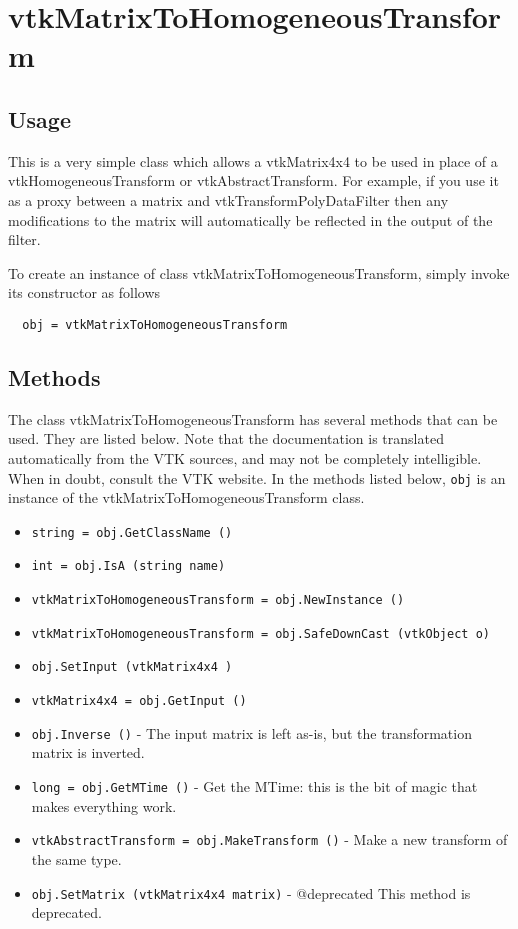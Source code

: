\section{vtkMatrixToHomogeneousTransform}

\subsection{Usage}

 This is a very simple class which allows a vtkMatrix4x4 to be used in
 place of a vtkHomogeneousTransform or vtkAbstractTransform.  For example,
 if you use it as a proxy between a matrix and vtkTransformPolyDataFilter
 then any modifications to the matrix will automatically be reflected in
 the output of the filter.

To create an instance of class vtkMatrixToHomogeneousTransform, simply
invoke its constructor as follows
\begin{verbatim}
  obj = vtkMatrixToHomogeneousTransform
\end{verbatim}
\subsection{Methods}

The class vtkMatrixToHomogeneousTransform has several methods that can be used.
  They are listed below.
Note that the documentation is translated automatically from the VTK sources,
and may not be completely intelligible.  When in doubt, consult the VTK website.
In the methods listed below, \verb|obj| is an instance of the vtkMatrixToHomogeneousTransform class.
\begin{itemize}
\item  \verb|string = obj.GetClassName ()|

\item  \verb|int = obj.IsA (string name)|

\item  \verb|vtkMatrixToHomogeneousTransform = obj.NewInstance ()|

\item  \verb|vtkMatrixToHomogeneousTransform = obj.SafeDownCast (vtkObject o)|

\item  \verb|obj.SetInput (vtkMatrix4x4 )|

\item  \verb|vtkMatrix4x4 = obj.GetInput ()|

\item  \verb|obj.Inverse ()| -  The input matrix is left as-is, but the transformation matrix
 is inverted.

\item  \verb|long = obj.GetMTime ()| -  Get the MTime: this is the bit of magic that makes everything work.

\item  \verb|vtkAbstractTransform = obj.MakeTransform ()| -  Make a new transform of the same type.

\item  \verb|obj.SetMatrix (vtkMatrix4x4 matrix)| -  @deprecated This method is deprecated.

\end{itemize}
